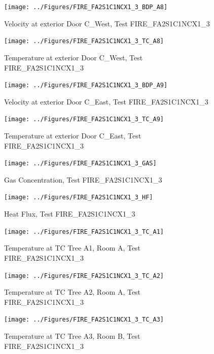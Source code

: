 \documentclass[11pt,oneside]{book}
\begin{document}
\begin{figure}[!ht]
\texttt{[image: ../Figures/FIRE\_FA2S1C1NCX1\_3\_BDP\_A8]}
\caption{Velocity at exterior Door C\_West, Test FIRE\_FA2S1C1NCX1\_3}
\label{fig:FIRE_FA2S1C1NCX1_3_BDP_A8}
\end{figure}

\begin{figure}[!ht]
\texttt{[image: ../Figures/FIRE\_FA2S1C1NCX1\_3\_TC\_A8]}
\caption{Temperature at exterior Door C\_West, Test FIRE\_FA2S1C1NCX1\_3}
\label{fig:FIRE_FA2S1C1NCX1_3_TC_A8}
\end{figure}

\begin{figure}[!ht]
\texttt{[image: ../Figures/FIRE\_FA2S1C1NCX1\_3\_BDP\_A9]}
\caption{Velocity at exterior Door C\_East, Test FIRE\_FA2S1C1NCX1\_3}
\label{fig:FIRE_FA2S1C1NCX1_3_BDP_A9}
\end{figure}

\begin{figure}[!ht]
\texttt{[image: ../Figures/FIRE\_FA2S1C1NCX1\_3\_TC\_A9]}
\caption{Temperature at exterior Door C\_East, Test FIRE\_FA2S1C1NCX1\_3}
\label{fig:FIRE_FA2S1C1NCX1_3_TC_A9}
\end{figure}

\begin{figure}[!ht]
\texttt{[image: ../Figures/FIRE\_FA2S1C1NCX1\_3\_GAS]}
\caption{Gas Concentration, Test FIRE\_FA2S1C1NCX1\_3}
\label{fig:FIRE_FA2S1C1NCX1_3_GAS}
\end{figure}

\begin{figure}[!ht]
\texttt{[image: ../Figures/FIRE\_FA2S1C1NCX1\_3\_HF]}
\caption{Heat Flux, Test FIRE\_FA2S1C1NCX1\_3}
\label{fig:FIRE_FA2S1C1NCX1_3_HF}
\end{figure}

\begin{figure}[!ht]
\texttt{[image: ../Figures/FIRE\_FA2S1C1NCX1\_3\_TC\_A1]}
\caption{Temperature at TC Tree A1, Room A, Test FIRE\_FA2S1C1NCX1\_3}
\label{fig:FIRE_FA2S1C1NCX1_3_TC_A1}
\end{figure}

\begin{figure}[!ht]
\texttt{[image: ../Figures/FIRE\_FA2S1C1NCX1\_3\_TC\_A2]}
\caption{Temperature at TC Tree A2, Room A, Test FIRE\_FA2S1C1NCX1\_3}
\label{fig:FIRE_FA2S1C1NCX1_3_TC_A2}
\end{figure}

\begin{figure}[!ht]
\texttt{[image: ../Figures/FIRE\_FA2S1C1NCX1\_3\_TC\_A3]}
\caption{Temperature at TC Tree A3, Room B, Test FIRE\_FA2S1C1NCX1\_3}
\label{fig:FIRE_FA2S1C1NCX1_3_TC_A3}
\end{figure}
\end{document}
